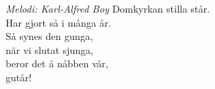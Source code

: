 {\footnotesize\textit{Melodi: Karl-Alfred Boy}}
\vspace{10pt}
Domkyrkan stilla står. \\
Har gjort så i många år. \\
Så synes den gunga, \\
när vi slutat sjunga, \\
beror det å nåbben vår, \\
gutår!